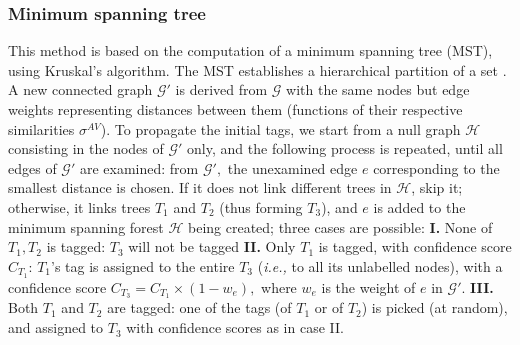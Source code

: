 \subsubsection{Minimum spanning tree}
This method is based on the computation of a minimum spanning tree (MST), using Kruskal's algorithm. The MST establishes a hierarchical partition of a set \cite{perret2015}. A new connected graph $\mathcal{G'}$ is derived from $\mathcal{G}$ with the same nodes but edge weights representing distances between them (functions of their respective similarities $\sigma^{AV}$). To propagate the initial tags, we start from a null graph $\mathcal{H}$ consisting in the nodes of $\mathcal{G'}$ only, and the following process is repeated, until all edges of $\mathcal{G'}$ are examined: from $\mathcal{G'},$ the unexamined edge $e$ corresponding to the smallest distance is chosen. If it does not link different trees in \color{black}$\mathcal{H}$\color{black},  skip it; otherwise, it links trees $T_1$ and $T_2$ (thus forming  $T_3$), and $e$ is added to the minimum spanning forest $\mathcal{H}$ being created; three cases are possible: 
\textbf{I.}  None of $T_1, T_2$ is tagged: $T_3$ will not be tagged \textbf{II. } Only $T_1$ is tagged, with confidence score $C_{T_1}$: $T_1$'s tag is assigned to the entire  $T_3$ (\textit{i.e.,} to all its unlabelled nodes), with a confidence score $C_{T_3} = C_{T_1}\times(1-w_e), $ where $w_e$ is the weight of $e$ \color{black} in $\mathcal{G'}$. \color{black} \textbf{III. } Both $T_1$ and $T_2$ are tagged: one of the tags (of $T_1$ or of $T_2$) is picked (at random), and assigned to  $T_3$ with confidence scores as in case II. 


\endinput
